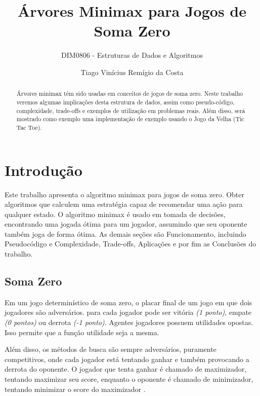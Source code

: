 \documentclass[sigplan,screen]{acmart}
\begin{document}
\title{Árvores Minimax para Jogos de Soma Zero}
\subtitle{DIM0806 - Estruturas de Dados e Algoritmos}

\author{Tiago Vinícius Remígio da Costa}

\begin{abstract}
  Árvores minimax têm sido usadas em conceitos de jogos de soma zero. 
  Neste trabalho veremos algumas implicações desta estrutura de dados, 
  assim como pseudo-código, complexidade, trade-offs e exemplos de utilização em problemas reais. 
  Além disso, será mostrado como exemplo uma implementação de exemplo usando o Jogo da Velha (Tic Tac Toe).
\end{abstract}


\maketitle
\pagestyle{plain}

\section{Introdução}
Este trabalho apresenta o algoritmo minimax \cite{russel2010} para jogos de soma zero. 
Obter algoritmos que calculem uma estratégia capaz de recomendar uma ação para qualquer estado. O algoritmo minimax é usado em tomada de decisões, encontrando uma jogada ótima para um jogador, assumindo que seu oponente também joga de forma ótima.
As demais seções são Funcionamento, incluindo Pseudocódigo e Complexidade, Trade-offs, Aplicações e por fim as Conclusões do trabalho.

\subsection{Soma Zero}
Em um jogo determinístico de soma zero, o placar final de um jogo em que dois jogadores são adversários.
para cada jogador pode ser vitória {\itshape(1 ponto)}, empate {\itshape(0 pontos)} ou derrota {\itshape(-1 ponto)}. 
Agentes jogadores possuem utilidades opostas. Isso permite que a função utilidade seja a mesma.

Além disso, os métodos de busca são sempre adversários, puramente competitivos, onde cada jogador está tentando ganhar e também provocando a derrota do oponente. O jogador que tenta ganhar é chamado de maximizador, tentando maximizar seu score, enquanto o oponente é chamado de minimizador, tentando minimizar o score do maximizador \cite{Aradhya01}.
\end{document}
